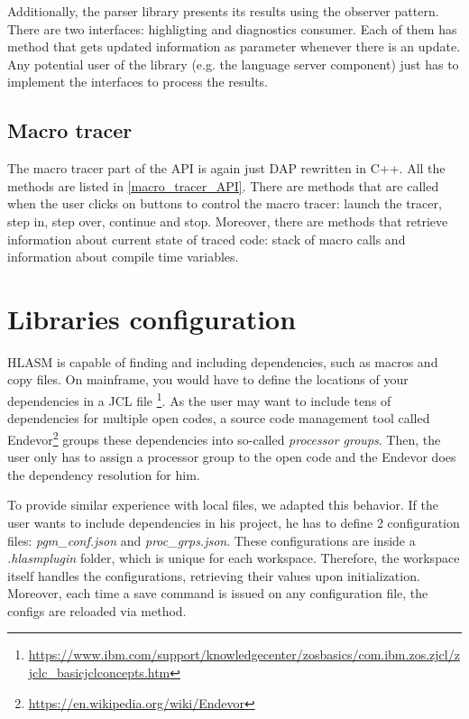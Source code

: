 Additionally, the parser library presents its results using the observer pattern. There are two interfaces: highligting and diagnostics consumer. Each of them has method  that gets updated information as parameter whenever there is an update. Any potential user of the library (e.g. the language server component) just has to implement the interfaces to process the results.

\subsection{Macro tracer}

The macro tracer part of the API is again just DAP rewritten in C++. All the methods are listed in \cref{macro_tracer_API}. There are methods that are called when the user clicks on buttons to control the macro tracer: launch the tracer, step in, step over, continue and stop. Moreover, there are methods that retrieve information about current state of traced code: stack of macro calls and information about compile time variables.

\section{Libraries configuration}

HLASM is capable of finding and including dependencies, such as macros and copy files. On mainframe, you would have to define the locations of your dependencies in a JCL file \footnote{\url{https://www.ibm.com/support/knowledgecenter/zosbasics/com.ibm.zos.zjcl/zjclc_basicjclconcepts.htm}}. As the user may want to include tens of dependencies for multiple open codes, a source code management tool called Endevor\footnote{\url{https://en.wikipedia.org/wiki/Endevor}} groups these dependencies into so-called \emph{processor groups}. Then, the user only has to assign a processor group to the open code and the Endevor does the dependency resolution for him.

To provide similar experience with local files, we adapted this behavior. If the user wants to include dependencies in his project, he has to define 2 configuration files: \emph{pgm\_conf.json} and \emph{proc\_grps.json}. These configurations are inside a \emph{.hlasmplugin} folder, which is unique for each workspace. Therefore, the workspace itself handles the configurations, retrieving their values upon initialization. Moreover, each time a save command is issued on any configuration file, the configs are reloaded via  method.

